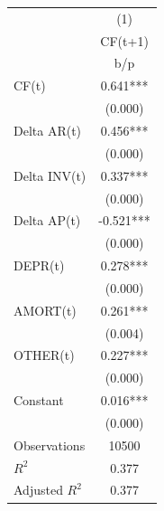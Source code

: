 {
\def\sym#1{\ifmmode^{#1}\else\(^{#1}\)\fi}
\begin{tabular}{l*{1}{c}}
\hline\hline
                    &\multicolumn{1}{c}{(1)}\\
                    &\multicolumn{1}{c}{CF(t+1)}\\
                    &         b/p   \\
\hline
CF(t)               &       0.641***\\
                    &     (0.000)   \\
Delta AR(t)         &       0.456***\\
                    &     (0.000)   \\
Delta INV(t)        &       0.337***\\
                    &     (0.000)   \\
Delta AP(t)         &      -0.521***\\
                    &     (0.000)   \\
DEPR(t)             &       0.278***\\
                    &     (0.000)   \\
AMORT(t)            &       0.261***\\
                    &     (0.004)   \\
OTHER(t)            &       0.227***\\
                    &     (0.000)   \\
Constant            &       0.016***\\
                    &     (0.000)   \\
\hline
Observations        &       10500   \\
\(R^{2}\)           &       0.377   \\
Adjusted \(R^{2}\)  &       0.377   \\
\hline\hline
\end{tabular}
}
